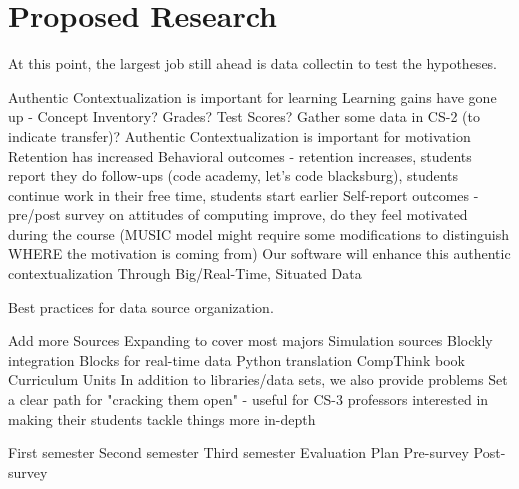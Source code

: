 \section{Proposed Research}

At this point, the largest job still ahead is data collectin to test the hypotheses.

Authentic Contextualization is important for learning
Learning gains have gone up - Concept Inventory? Grades? Test Scores? Gather some data in CS-2 (to indicate transfer)?
Authentic Contextualization is important for motivation
Retention has increased
Behavioral outcomes - retention increases, students report they do follow-ups (code academy, let's code blacksburg), students continue work in their free time, students start earlier
Self-report outcomes - pre/post survey on attitudes of computing improve, do they feel motivated during the course (MUSIC model might require some modifications to distinguish WHERE the motivation is coming from)
Our software will enhance this authentic contextualization
Through Big/Real-Time, Situated Data


Best practices for data source organization.



Add more Sources
Expanding to cover most majors
Simulation sources
Blockly integration
Blocks for real-time data
Python translation
CompThink book
Curriculum Units
In addition to libraries/data sets, we also provide problems
Set a clear path for "cracking them open" - useful for CS-3 professors interested in making their students tackle things more in-depth


	
	First semester
	Second semester
	Third semester
Evaluation Plan
	Pre-survey
	Post-survey